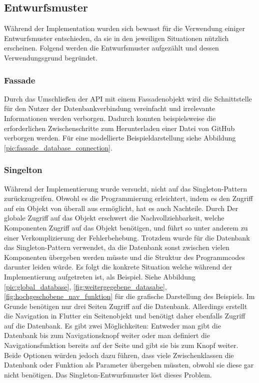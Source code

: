 \subsection{Entwurfsmuster}%
Während der Implementation wurden sich bewusst für die Verwendung einiger Entwurfsmuster entschieden, da sie in den jeweiligen Situationen nützlich erscheinen. %
Folgend werden die Entwurfsmuster aufgezählt und dessen Verwendungsgrund begründet.%
%
%
%
%
%
%
%
%
%
%
\subsubsection{Fassade}
Durch das Umschließen der API mit einem Fassadenobjekt wird die Schnittstelle für den Nutzer der Datenbankverbindung vereinfacht und irrelevante Informationen werden verborgen. Dadurch konnten beispielsweise die erforderlichen Zwischenschritte zum Herunterladen einer Datei von GitHub verborgen werden. %
\newline%
Für eine modellierte Beispieldarstellung siehe Abbildung \ref{pic:fassade_database_connection}.
%
%
%
%
%
%
\subsubsection{Singelton}%
Während der Implementierung wurde versucht, nicht auf das Singleton-Pattern zurückzugreifen. 
	Obwohl es die Programmierung erleichtert, indem es den Zugriff auf ein Objekt von überall aus ermöglicht, hat es auch Nachteile. %
	Durch Der globale Zugriff auf das Objekt erschwert die Nachvollziehbarkeit, welche Komponenten Zugriff auf das Objekt benötigen, und führt so unter anderem zu einer Verkomplizierung der Fehlerbehebung. %
Trotzdem wurde für die Datenbank das Singleton-Pattern verwendet, da die Datenbank sonst zwischen vielen Komponenten übergeben werden müsste und die Struktur des Programmcodes darunter leiden würde.\newline%
Es folgt die konkrete Situation welche während der Implementierung aufgetreten ist, als Beispiel. Siehe Abbildung \ref{pic:global_database}, \ref{fig:weitergegebene_datasabe}, \ref{fig:hochgeschobene_nav_funktion} für die grafische Darstellung des Beispiels. Im Grunde benötigen nur drei Seiten Zugriff auf die Datenbank. Allerdings erstellt die Navigation in Flutter ein Seitenobjekt und benötigt daher ebenfalls Zugriff auf die Datenbank. Es gibt zwei Möglichkeiten: Entweder man gibt die Datenbank bis zum Navigationsknopf weiter oder man definiert die Navigationsfunktion bereits auf der Seite und gibt sie bis zum Knopf weiter. Beide Optionen würden jedoch dazu führen, dass viele Zwischenklassen die Datenbank oder Funktion als Parameter übergeben müssten, obwohl sie diese gar nicht benötigen. Das Singleton-Entwurfsmuster löst dieses Problem.
%
%
%
%
%
%
